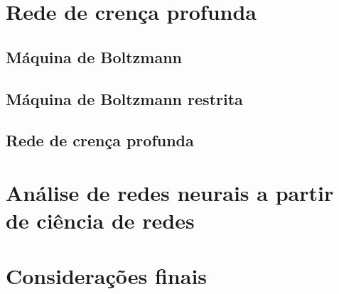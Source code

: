 \documentclass{article}
\begin{document}
    \section{Rede de crença profunda}

        \subsection{Máquina de Boltzmann}

        \subsection{Máquina de Boltzmann restrita}

        \subsection{Rede de crença profunda}

    \section{Análise de redes neurais a partir de ciência de redes}

    \section{Considerações finais}

    
    
\end{document}
